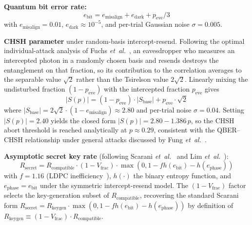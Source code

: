 \documentclass[conference]{IEEEtran}
\begin{document}
\textbf{Quantum bit error rate:}
\begin{equation}
e_{\mathrm{bit}} = e_{\mathrm{misalign}} + e_{\mathrm{dark}} + p_{\mathrm{eve}}/3 \label{eq:qber}
\end{equation}
with $e_{\mathrm{misalign}} = 0.01$, $e_{\mathrm{dark}} \approx 10^{-5}$, and per-trial Gaussian noise $\sigma = 0.005$.

\textbf{CHSH parameter} under random-basis intercept-resend. Following the optimal individual-attack analysis of Fuchs \emph{et~al.}~\cite{fuchs1997}, an eavesdropper who measures an intercepted photon in a randomly chosen basis and resends destroys the entanglement on that fraction, so its contribution to the correlation averages to the separable value $\sqrt{2}$ rather than the Tsirelson value $2\sqrt{2}$. Linearly mixing the undisturbed fraction $(1-p_{\mathrm{eve}})$ with the intercepted fraction $p_{\mathrm{eve}}$ gives
\begin{equation}
|S(p)| = (1 - p_{\mathrm{eve}}) \cdot |S_{\mathrm{base}}| + p_{\mathrm{eve}} \cdot \sqrt{2} \label{eq:S_of_p}
\end{equation}
where $|S_{\mathrm{base}}| = 2\sqrt{2} \cdot (1 - e_{\mathrm{misalign}}) \approx 2.80$ and per-trial noise $\sigma = 0.04$. Setting $|S(p)| = 2.40$ yields the closed form $|S(p)| = 2.80 - 1.386\,p$, so the CHSH abort threshold is reached analytically at $p \approx 0.29$, consistent with the QBER--CHSH relationship under general attacks discussed by Fung \emph{et~al.}~\cite{fung2006}.

\textbf{Asymptotic secret key rate} (following Scarani \emph{et~al.}~\cite{scarani2009} and Lim \emph{et~al.}~\cite{lim2014}):
\begin{equation}
R_{\mathrm{secret}} = R_{\mathrm{compatible}} \cdot (1 - V_{\mathrm{frac}}) \cdot \max(0, 1 - f h(e_{\mathrm{bit}}) - h(e_{\mathrm{phase}})) \label{eq:rsecret}
\end{equation}
with $f = 1.16$ (LDPC inefficiency~\cite{elkouss2011}), $h(\cdot)$ the binary entropy function, and $e_{\mathrm{phase}} = e_{\mathrm{bit}}$ under the symmetric intercept-resend model. The $(1 - V_{\mathrm{frac}})$ factor selects the key-generation subset of $R_{\mathrm{compatible}}$, recovering the standard Scarani form $R_{\mathrm{secret}} = R_{\mathrm{keygen}} \cdot \max(0, 1 - f h(e_{\mathrm{bit}}) - h(e_{\mathrm{phase}}))$ by definition of $R_{\mathrm{keygen}} \equiv (1 - V_{\mathrm{frac}}) \cdot R_{\mathrm{compatible}}$.
\end{document}
